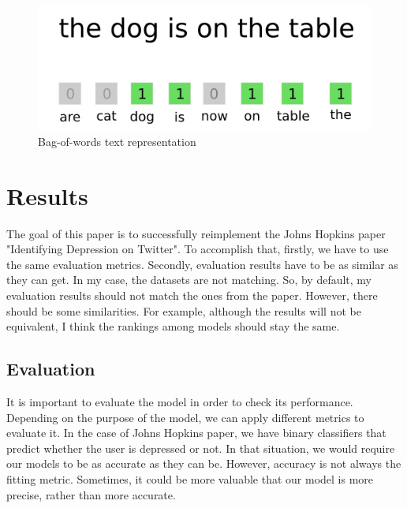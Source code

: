 \documentclass[times, utf8, seminar]{fer}
\begin{document}
\begin{figure}[h]
	\centering
	\includegraphics[width=12cm]{bag-of-words}
	\caption{Bag-of-words text representation\protect \footnotemark}
\end{figure}




\chapter{Results}

 The goal of this paper is to successfully reimplement the Johns Hopkins paper "Identifying Depression on Twitter". To accomplish that, firstly, we have to use the same evaluation metrics. Secondly, evaluation results have to be as similar as they can get. In my case, the datasets are not matching. So, by default, my evaluation results should not match the ones from the paper.  However, there should be some similarities. For example, although the results will not be equivalent, I think the rankings among models should stay the same. 

\section{Evaluation}

It is important to evaluate the model in order to check its performance. Depending on the purpose of the model, we can apply different metrics to evaluate it. In the case of Johns Hopkins paper, we have binary classifiers that predict whether the user is depressed or not. In that situation, we would require our models to be as accurate as they can be. However, accuracy is not always the fitting metric. Sometimes, it could be more valuable that our model is more precise, rather than more accurate. 
\end{document}
